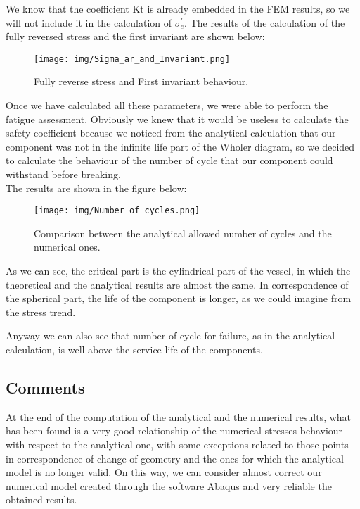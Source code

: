 \documentclass[a4paper,12pt]{article}
\begin{document}
We know that the coefficient Kt is already embedded in the FEM results, so we will not include it in the calculation of $\sigma_e^{'}$. The results of the calculation of the fully reversed stress and the first invariant are shown below:

\begin{figure}[H]
\centering
\texttt{[image: img/Sigma\_ar\_and\_Invariant.png]}
\caption{Fully reverse stress and First invariant behaviour.}
\end{figure}

Once we have calculated all these parameters, we were able to perform the fatigue assessment. Obviously we knew that it would be useless to calculate the safety coefficient because we noticed from the analytical calculation that our component was not in the infinite life part of the Wholer diagram, so we decided to calculate the behaviour of the number of cycle that our component could withstand before breaking.\\ The results are shown in the figure below:

\begin{figure}[H]
\centering
\texttt{[image: img/Number\_of\_cycles.png]}
\caption{Comparison between the analytical allowed number of cycles and the numerical ones.}
\end{figure}

As we can see, the critical part is the cylindrical part of the vessel, in which the theoretical and the analytical results are almost the same. In correspondence of the spherical part, the life of the component is longer, as we could imagine from the stress trend.

Anyway we can also see that number of cycle for failure, as in the analytical calculation, is well above the service life of the components.

\subsection{Comments}


At the end of the computation of the analytical and the numerical results, what has been found is a very good relationship of the numerical stresses behaviour with respect to the analytical one, with some exceptions related to those points in correspondence of change of geometry and the ones for which the analytical model is no longer valid. On this way, we can consider almost correct our numerical model created through the software Abaqus and very reliable the obtained results.
\end{document}
